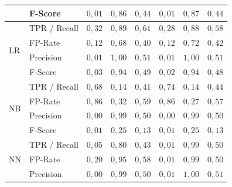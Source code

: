 \begin{table}[h!t]
{\begin{tabular}{|ll|rrr|rrr|}
                     & F-Score      & $0,01$             & $0,86$                 & $0,44$                     & $0,01$             & $0,87$                 & $0,44$                      \\ 
\hline
\multirow{4}{*}{LR}  & TPR / Recall & $0,32$             & $0,89$                 & $0,61$                     & $0,28$             & $0,88$                 & $0,58$                      \\
                     & FP-Rate      & $0,12$             & $0,68$                 & $0,40$                     & $0,12$             & $0,72$                 & $0,42$                      \\
                     & Precision    & $0,01$             & $1,00$                 & $0,51$                     & $0,01$             & $1,00$                 & $0,51$                      \\
                     & F-Score      & $0,03$             & $0,94$                 & $0,49$                     & $0,02$             & $0,94$                 & $0,48$                      \\ 
\hline
\multirow{4}{*}{NB}  & TPR / Recall & $0,68$             & $0,14$                 & $0,41$                     & $0,74$             & $0,14$                 & $0,44$                      \\
                     & FP-Rate      & $0,86$             & $0,32$                 & $0,59$                     & $0,86$             & $0,27$                 & $0,57$                      \\
                     & Precision    & $0,00$             & $0,99$                 & $0,50$                     & $0,00$             & $0,99$                 & $0,50$                      \\
                     & F-Score      & $0,01$             & $0,25$                 & $0,13$                     & $0,01$             & $0,25$                 & $0,13$                      \\ 
\hline
\multirow{4}{*}{NN}  & TPR / Recall & $0,05$             & $0,80$                 & $0,43$                     & $0,01$             & $0,99$                 & $0,50$                      \\
                     & FP-Rate      & $0,20$             & $0,95$                 & $0,58$                     & $0,01$             & $0,99$                 & $0,50$                      \\
                     & Precision    & $0,00$             & $0,99$                 & $0,50$                     & $0,01$             & $1,00$                 & $0,51$                      \\

\end{tabular}}
\end{table}
